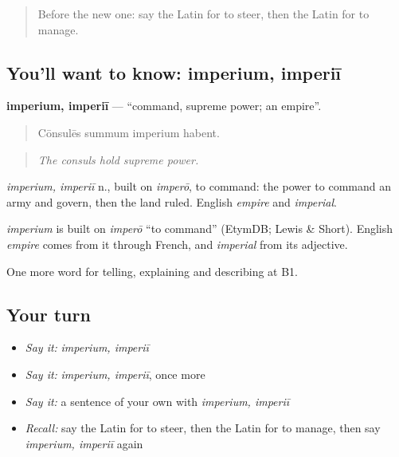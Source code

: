 \label{lesson:LA-C385-imperium}



\begin{quote}
Before the new one: say the Latin for to steer, then the Latin for to manage.
\end{quote}

\subsection*{You'll want to know: imperium, imperiī}
\textbf{imperium, imperiī} — \textquotedblleft{}command, supreme power; an empire\textquotedblright{}.

\begin{quote}
Cōnsulēs summum imperium habent.
\end{quote}

\begin{quote}
\emph{The consuls hold supreme power.}
\end{quote}

\emph{imperium, imperiī} n., built on \emph{imperō}, to command: the power to command an army and govern, then the land ruled. English \emph{empire} and \emph{imperial}.

\begin{cousinweb}
\emph{imperium} is built on \emph{imperō} \textquotedblleft{}to command\textquotedblright{} (EtymDB; Lewis \& Short). English \emph{empire} comes from it through French, and \emph{imperial} from its adjective.
\end{cousinweb}

\begin{grammarlens}[title={What you've built}]
One more word for telling, explaining and describing at B1.
\end{grammarlens}

\subsection*{Your turn}
\begin{itemize}
\raggedright
  \item \emph{Say it:} \emph{imperium, imperiī}
  \item \emph{Say it:} \emph{imperium, imperiī}, once more
  \item \emph{Say it:} a sentence of your own with \emph{imperium, imperiī}
  \item \emph{Recall:} say the Latin for to steer, then the Latin for to manage, then say \emph{imperium, imperiī} again
\end{itemize}

